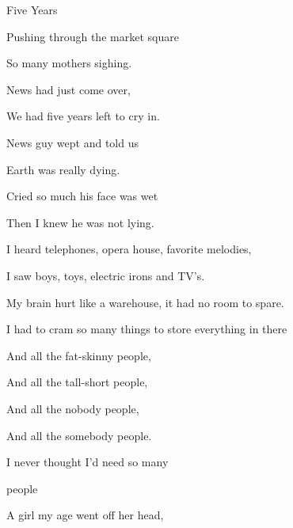 \begin{song}{Five Years}{
	
	\chordset[Verse]{ \GMaj \Em \AMaj \CMajBassG }

	\chordset[Bridge]{ \Am \GMaj \DSeven}
	
}

\begin{songverse}

Pushing through the market square

So many mothers sighing.

News had just come over,

We had five years left to cry in.


News guy wept and told us 

Earth was really dying.

Cried so much his face was wet

Then I knew he was not lying.

\end{songverse}

\begin{songverse}

I heard telephones, opera house, favorite melodies,

I saw boys, toys, electric irons and TV's.

My brain hurt like a warehouse, it had no room to spare.               
 
I had to cram so many things to store everything in there

\end{songverse}

\begin{songverse*}[Bridge]

And all the fat-skinny \mbox{people, \quad {}}

And all the tall-short people,\quad {}

And all the nobody people, \quad {}
                      
And all the somebody people.

I never thought I'd need so many 

people \quad {}

\end{songverse*}

\begin{songverse}                                 
 A girl my age went off her head,
 

\end{songverse}
\end{song}
